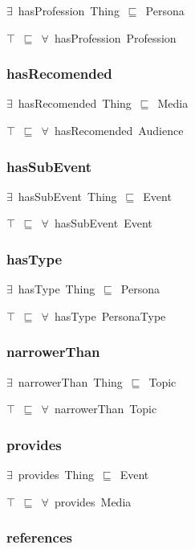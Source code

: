 \documentclass{article}
\begin{document}
\ensuremath{\exists}~hasProfession~Thing~\ensuremath{\sqsubseteq}~Persona

\ensuremath{\top}~\ensuremath{\sqsubseteq}~\ensuremath{\forall}~hasProfession~Profession

\subsubsection*{hasRecomended}

\ensuremath{\exists}~hasRecomended~Thing~\ensuremath{\sqsubseteq}~Media

\ensuremath{\top}~\ensuremath{\sqsubseteq}~\ensuremath{\forall}~hasRecomended~Audience

\subsubsection*{hasSubEvent}

\ensuremath{\exists}~hasSubEvent~Thing~\ensuremath{\sqsubseteq}~Event

\ensuremath{\top}~\ensuremath{\sqsubseteq}~\ensuremath{\forall}~hasSubEvent~Event

\subsubsection*{hasType}

\ensuremath{\exists}~hasType~Thing~\ensuremath{\sqsubseteq}~Persona

\ensuremath{\top}~\ensuremath{\sqsubseteq}~\ensuremath{\forall}~hasType~PersonaType

\subsubsection*{narrowerThan}

\ensuremath{\exists}~narrowerThan~Thing~\ensuremath{\sqsubseteq}~Topic

\ensuremath{\top}~\ensuremath{\sqsubseteq}~\ensuremath{\forall}~narrowerThan~Topic

\subsubsection*{provides}

\ensuremath{\exists}~provides~Thing~\ensuremath{\sqsubseteq}~Event

\ensuremath{\top}~\ensuremath{\sqsubseteq}~\ensuremath{\forall}~provides~Media

\subsubsection*{references}
\end{document}
